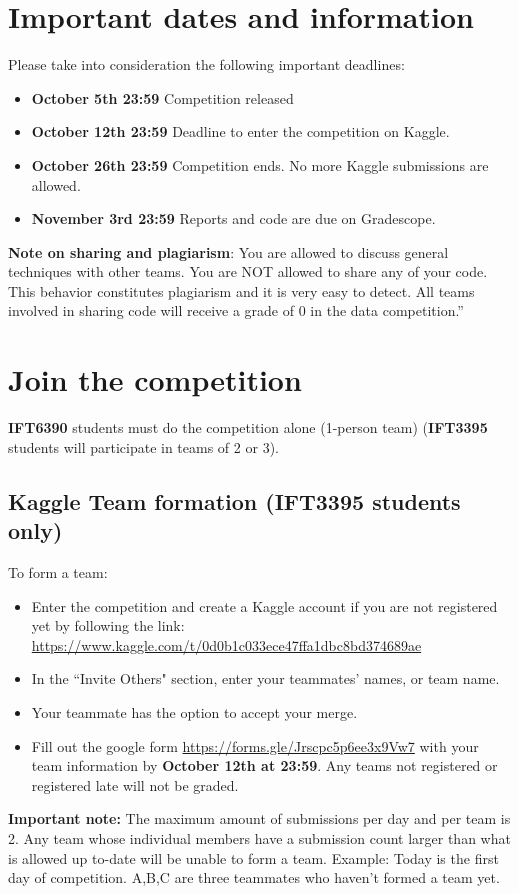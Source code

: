 \documentclass[12pt]{article}
\begin{document}
\section{Important dates and information}
\label{sec:dates}

Please take into consideration the following important deadlines:
 
\begin{itemize}
 \item \textbf{October 5th 23:59} Competition released
 \item \textbf{October 12th 23:59} Deadline to enter the competition on Kaggle.
 \item \textbf{October 26th 23:59} Competition ends. No more Kaggle submissions are allowed.
 \item \textbf{November 3rd 23:59} Reports and code are due on Gradescope.
\end{itemize}
 
\textbf{Note on sharing and plagiarism}:
You are allowed to discuss general techniques with other teams. You are NOT allowed to share any of your code. This behavior constitutes plagiarism and it is very easy to detect. All teams involved in sharing code will receive a grade of 0 in the data competition.”

\section{Join the competition}

\textbf{IFT6390} students must do the competition alone (1-person team) (\textbf{IFT3395} students will participate in teams of 2 or 3).


\subsection{Kaggle Team formation (IFT3395 students only)}

To form a team:
\begin{itemize}
\item Enter the competition and create a Kaggle account if you are not registered yet by following the link: \href{https://www.kaggle.com/t/0d0b1c033ece47ffa1dbc8bd374689ae}{https://www.kaggle.com/t/0d0b1c033ece47ffa1dbc8bd374689ae}
\item In the ``Invite Others" section, enter your teammates’ names, or team name.
\item Your teammate has the option to accept your merge.
\item Fill out the google form \url{https://forms.gle/Jrscpc5p6ee3x9Vw7} with your team information by \textbf{October 12th at 23:59}. Any teams not registered or registered late will not be graded.

\end{itemize}
\textbf{Important note:} The maximum amount of submissions per day and per team is 2. Any team whose individual members have a submission count larger than what is allowed up to-date will be unable to form a team. Example: Today is the first day of competition. A,B,C are three teammates who haven’t formed a team yet.
\end{document}
